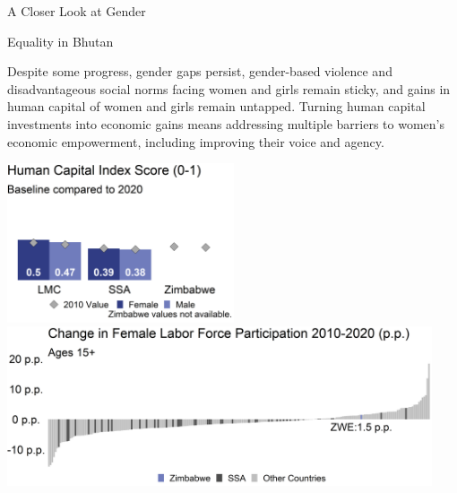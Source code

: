 \documentclass[
]{article}
\begin{document}
\begin{minipage}[c][1.4cm][t]{19.5cm}
\begin{minipage}[c][1.4cm][t]{6.5cm}
\fontsize{14}{1}\selectfont   
A Closer Look at Gender
  
\vspace{.2cm}
  
Equality in Bhutan
\normalsize
\end{minipage}
\begin{minipage}[c][1.4cm][t]{12.75cm}
\fontsize{9}{8}\selectfont   
Despite some progress, gender gaps persist, gender-based violence and disadvantageous social norms facing women and girls remain sticky, and gains in human capital of women and girls remain untapped. Turning human capital investments into economic gains means addressing multiple barriers to women’s economic empowerment, including improving their voice and agency.
\normalsize
\end{minipage}
\end{minipage}

\vspace{.4cm}

\begin{minipage}[t][4.7cm][t]{19.5cm}
\href{https://genderdata.worldbank.org/indicators/hd-hci-ovrl}{\includegraphics[height=4.7cm]{HCIplot.png}}\hspace{.2cm}
\href{https://genderdata.worldbank.org/indicators/sl-tlf-acti-zs/}{\includegraphics[height=4.7cm]{LFPplot.png}}  
\end{minipage}

\vspace{.2cm}
\end{document}
